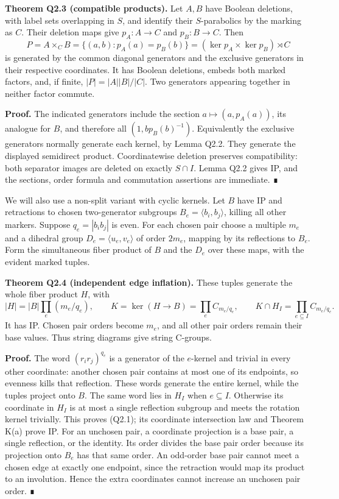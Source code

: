 \documentclass[
  10pt,
  letterpaper,
]{article}
\begin{document}
\textbf{Theorem Q2.3 (compatible products).} Let \(A,B\) have Boolean
deletions, with label sets overlapping in \(S\), and identify their
\(S\)-parabolics by the marking as \(C\). Their deletion maps give
\(p_A:A\to C\) and \(p_B:B\to C\). Then \[
 P=A\times_C B=\{(a,b):p_A(a)=p_B(b)\}
   =(\ker p_A\times\ker p_B)\rtimes C
\] is generated by the common diagonal generators and the exclusive
generators in their respective coordinates. It has Boolean deletions,
embeds both marked factors, and, if finite, \(|P|=|A||B|/|C|\). Two
generators appearing together in neither factor commute.

\textbf{Proof.} The indicated generators include the section
\(a\mapsto(a,p_A(a))\), its analogue for \(B\), and therefore all
\((1,bp_B(b)^{-1})\). Equivalently the exclusive generators normally
generate each kernel, by Lemma Q2.2. They generate the displayed
semidirect product. Coordinatewise deletion preserves compatibility:
both separator images are deleted on exactly \(S\cap I\). Lemma Q2.2
gives IP, and the sections, order formula and commutation assertions are
immediate. ∎

We will also use a non-split variant with cyclic kernels. Let \(B\) have
IP and retractions to chosen two-generator subgroups
\(B_e=\langle b_i,b_j\rangle\), killing all other markers. Suppose
\(q_e=|b_ib_j|\) is even. For each chosen pair choose a multiple \(m_e\)
and a dihedral group \(D_e=\langle u_e,v_e\rangle\) of order \(2m_e\),
mapping by its reflections to \(B_e\). Form the simultaneous fiber
product of \(B\) and the \(D_e\) over these maps, with the evident
marked tuples.

\textbf{Theorem Q2.4 (independent edge inflation).} These tuples
generate the whole fiber product \(H\), with \[
 |H|=|B|\prod_e(m_e/q_e),\qquad
 K=\ker(H\to B)=\prod_e C_{m_e/q_e},\qquad
 K\cap H_I=\prod_{e\subseteq I}C_{m_e/q_e}.                 \tag{Q2.1}
\] It has IP. Chosen pair orders become \(m_e\), and all other pair
orders remain their base values. Thus string diagrams give string
C-groups.

\textbf{Proof.} The word \((r_i r_j)^{q_e}\) is a generator of the
\(e\)-kernel and trivial in every other coordinate: another chosen pair
contains at most one of its endpoints, so evenness kills that
reflection. These words generate the entire kernel, while the tuples
project onto \(B\). The same word lies in \(H_I\) when \(e\subseteq I\).
Otherwise its coordinate in \(H_I\) is at most a single reflection
subgroup and meets the rotation kernel trivially. This proves (Q2.1);
its coordinate intersection law and Theorem K(a) prove IP. For an
unchosen pair, a coordinate projection is a base pair, a single
reflection, or the identity. Its order divides the base pair order
because its projection onto \(B_e\) has that same order. An odd-order
base pair cannot meet a chosen edge at exactly one endpoint, since the
retraction would map its product to an involution. Hence the extra
coordinates cannot increase an unchosen pair order. ∎
\end{document}
